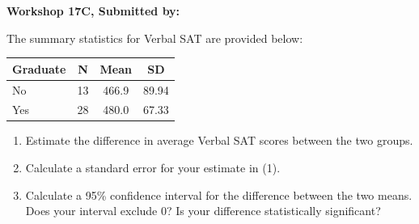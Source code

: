 \documentclass[11pt, chapterprefix=true]{scrbook}\usepackage[]{graphicx}\usepackage[]{color}
\begin{document}
\begin{exercises}
\begin{exercise}
\end{exercise}
\begin{solution}  %

\end{solution}

\clearpage

    \begin{exercise}  %

    \begin{center}
\begin{flushleft}\textbf{\large \hfill Workshop 17C, Submitted by: }\end{flushleft}

\end{center}

The summary statistics for Verbal SAT are provided below:

\begin{center}				
\begin{tabular}{@{} lccc @{}} \hline				
Graduate & N & Mean & SD \\ \hline
No & 13 & 466.9 & 89.94 \\ 
Yes & 28 & 480.0 & 67.33 \\ \hline
\end{tabular}
\end{center} 

\begin{enumerate}
\item Estimate the difference in average Verbal SAT scores between the two groups.
\item Calculate a standard error for your estimate in (1).
\item Calculate a 95\% confidence interval for the difference between the two means. Does your interval exclude 0? Is your difference statistically significant?
\end{enumerate}


\end{exercise}
\end{exercises}
\end{document}

